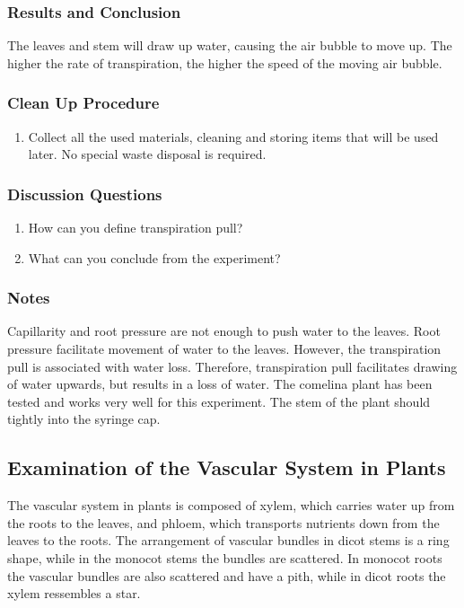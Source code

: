 \subsubsection*{Results and Conclusion}
The leaves and stem will draw up water, causing the air bubble to move up. The higher the rate of transpiration, the higher the speed of the moving air bubble.

\subsubsection*{Clean Up Procedure}
\begin{enumerate}
\item{Collect all the used materials, cleaning and storing items that will be used later. No special waste disposal is required.}
\end{enumerate}

\subsubsection*{Discussion Questions}
\begin{enumerate}
\item{How can you define transpiration pull?}
\item{What can you conclude from the experiment?}
\end{enumerate}

\subsubsection*{Notes}
Capillarity and root pressure are not enough to push water to the leaves. Root pressure facilitate movement of water to the leaves. However, the transpiration pull is associated with water loss. Therefore, transpiration pull facilitates drawing of water upwards, but results in a loss of water. The comelina plant has been tested and works very well for this experiment. The stem of the plant should tightly into the syringe cap.


\subsection{Examination of the Vascular System in Plants}

The vascular system in plants is composed of xylem, which carries water up from the roots to the leaves, and phloem, which transports nutrients down from the leaves to the roots. The arrangement of vascular bundles in dicot stems is a ring shape, while in the monocot stems the bundles are scattered. In monocot roots the vascular bundles are also scattered and have a pith, while in dicot roots the xylem ressembles a star. 

